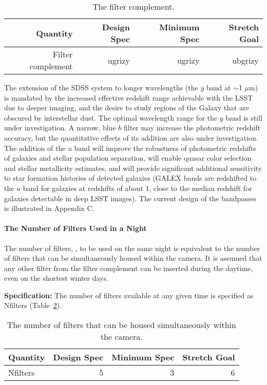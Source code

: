 \begin{table}[h!]
\begin{tabular}{|r|r|r|r|}
\hline
Quantity               & Design Spec & Minimum Spec & Stretch Goal      \\
\hline
 Filter complement     &   ugrizy      &   ugrizy       &   ubgrizy \\
\hline
\end{tabular}
\caption{The filter complement.}
\label{Tfilters}
\end{table}

\vskip -0.1in
The extension of the SDSS system to longer wavelengths (the $y$ band at
$\sim$1 $\mu$m) is
mandated by the increased effective redshift range achievable with the LSST
due to deeper imaging, and the desire to study regions of the Galaxy that
are obscured by interstellar dust.
The optimal wavelength range for the $y$ band is
still under investigation. A narrow, blue $b$ filter may increase the
photometric redshift accuracy, but the quantitative effects of its addition
are also under investigation. The addition of the $u$ band will improve the
robustness of photometric redshifts of galaxies and stellar population
separation, will enable quasar color selection and stellar metallicity
estimates, and will provide significant additional sensitivity to star
formation histories of detected galaxies (\eg GALEX bands are redshifted
to the $u$ band for galaxies at redshifts of about 1, close to the median
redshift for galaxies detectable in deep LSST images). The current design of
the bandpasses is illustrated in Appendix C.



\paragraph{\vskip -0.2in The Number of Filters Used in a Night\\}

The number of filters,
,
to be used on the same night is
equivalent to the number of filters that can be simultaneously housed
within the camera. It is assumed that any other filter from the filter
complement can be inserted during the daytime, even on the shortest
winter days.

{\bf Specification:} The number of filters available at any given time is
specified as Nfilters (Table~\ref{Tfilterchanges}).

\begin{table}[bh!]
\begin{tabular}{|l|r|r|r|}
\hline
Quantity        & Design Spec & Minimum Spec & Stretch Goal      \\
\hline
 Nfilters       &      5      &      3       &       6           \\
\hline
\end{tabular}
\caption{The number of filters that can be housed simultaneously within the
camera.}
\label{Tfilterchanges}
\end{table}


